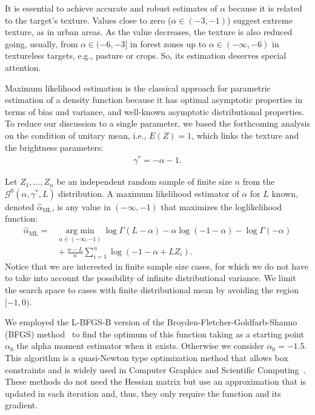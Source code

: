\documentclass[twocolumn]{svjour3}
\newcommand{\argmin}{\operatorname*{\text{arg min }}}
\begin{document}
	It is essential to achieve accurate and robust estimates of $\alpha$ because it is related to the target's texture. 
	Values close to zero ($\alpha \in (-3,-1)$) suggest extreme texture, as in urban areas. 
	As the value decreases, the texture is also reduced going, usually, from $\alpha \in (-6,-3]$ in forest zones up to $\alpha\in(-\infty,-6)$ in textureless targets, e.g., pasture or crops. So, its estimation deserves special attention.
	
	Maximum likelihood estimation is the classical approach for parametric estimation of a density function because it has optimal asymptotic properties in terms of bias and variance, and well-known asymptotic distributional properties.
	To reduce our discussion to a single parameter, we based the forthcoming analysis on the condition of unitary mean, i.e., $E(Z)=1$, which links the texture and the brightness parameters:
	\begin{align}
		\label{RelationAlphaGamma}
		\gamma^* =-\alpha-1.
	\end{align}
	
	Let $Z_1,\dots, Z_n$ be an independent random sample of finite size $n$ from the $\mathcal G^0(\alpha,\gamma^*,L)$ distribution.
	A maximum likelihood estimator of $\alpha$ for $L$ known, denoted $\widehat\alpha_{\text{{ML}}}$, is any value in $(-\infty,-1)$ that maximizes the loglikelihood function:
	\begin{align}
		\hat{\alpha}_{\text{{ML}}}=&\argmin_{\alpha \in (-\infty,-1)}\log \Gamma(L-\alpha)-
		\alpha\log(-1-\alpha)-\log\Gamma(-\alpha) \nonumber \\
		&\mbox{}+\frac{\alpha-L}{n} \sum_{i=1}^n\log(-1-\alpha+L Z_i).
		\label{ML}
	\end{align}
	Notice that we are interested in finite sample size cases, for which we do not have to take into account the possibility of infinite distributional variance.
	We limit the search space to cases with finite distributional mean by avoiding the region $[-1,0)$.
	
	We employed the L-BFGS-B version of the Broyden-Fletcher-Goldfarb-Shanno (BFGS) method~\cite{Luenberger2008} to find the optimum of this function taking as a starting point $\alpha_0$ the alpha moment estimator when it exists. Otherwise we consider $\alpha_0=-1.5$. This algorithm is a quasi-Newton type optimization method that allows box constraints and is widely used in Computer Graphics and Scientific Computing~\cite{FEI2014}. 
	These methods do not need the Hessian matrix but use an approximation that is updated in each iteration and, thus, they only require the function and its gradient. 
	
\end{document}
